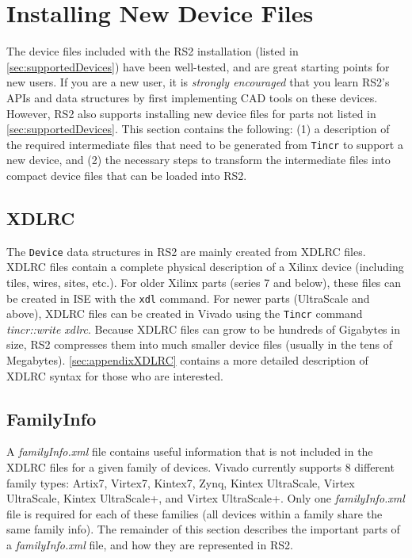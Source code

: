 \newpage
\section{Installing New Device Files} \label{sec:installingDeviceFiles}
The device files included with the RS2 installation (listed in
\autoref{sec:supportedDevices}) have been well-tested, and are great starting
points for new users. If you are a new user, it is \emph{strongly encouraged}
that you learn RS2's APIs and data structures by first implementing CAD tools on
these devices. However, RS2 also supports installing new device files
for parts not listed in \autoref{sec:supportedDevices}. This section contains
the following: (1) a description of the required intermediate files that need to be
generated from \texttt{Tincr} to support a new device, and (2) the necessary
steps to transform the intermediate files into compact device files that can be
loaded into RS2.

\subsection {XDLRC}
The \texttt{Device} data structures in RS2 are mainly created from XDLRC
files. XDLRC files contain a complete physical description of a Xilinx device
(including tiles, wires, sites, etc.). For older Xilinx parts (series 7 and
below), these files can be created in ISE with the \texttt{xdl} command. For
newer parts (UltraScale and above), XDLRC files can be created in Vivado using
the \texttt{Tincr} command \textit{tincr::write xdlrc}. Because XDLRC files can
grow to be hundreds of Gigabytes in size, RS2 compresses them into much smaller device files
(usually in the tens of Megabytes). \autoref{sec:appendixXDLRC} contains a more
detailed description of XDLRC syntax for those who are interested.

\subsection{FamilyInfo}
A \textit{familyInfo.xml} file contains useful information that is
not included in the XDLRC files for a given family of devices. Vivado currently 
supports 8 different family types: Artix7, Virtex7, Kintex7, Zynq, Kintex
UltraScale, Virtex UltraScale, Kintex UltraScale+, and Virtex UltraScale+. Only
one \textit{familyInfo.xml} file is required for each of these families (all 
devices within a family share the same family info). The remainder of this
section describes the important parts of a \textit{familyInfo.xml} file, and how
they are represented in RS2.

